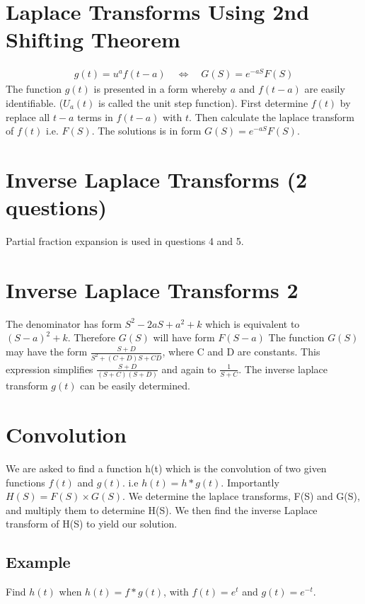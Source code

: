 \documentclass[12pt, a4paper]{article}
\begin{document}
\section{Laplace Transforms Using 2nd Shifting Theorem}

\begin{eqnarray}
 g(t) = u^{a}f(t-a) \quad \Leftrightarrow \quad G(S)= e^{-aS}F(S) \nonumber
\end{eqnarray}
The function $g(t)$ is presented in a form whereby $a$ and
$f(t-a)$ are easily identifiable. ($U_{a}(t)$ is called the unit
step function). First determine $f(t)$ by replace all $t-a$ terms
in $f(t-a)$ with $t$. Then calculate the laplace transform of
$f(t)$ i.e. $F(S)$. The solutions is in form $G(S)= e^{-aS}F(S)$.

\section{Inverse Laplace Transforms (2 questions) }
Partial fraction expansion is used in questions 4 and 5.
\section{Inverse Laplace Transforms 2}

The denominator has form $S^2 - 2aS + a^2 + k$ which is equivalent
to $(S-a)^2 + k$. Therefore $G(S)$ will have form $F(S-a)$
\newline
The function $G(S)$ may have the form $\frac{S+D}{S^2 +(C+D)S +
CD}$, where C and D are constants. This expression simplifies
$\frac{S+D}{(S+C)(S+D)}$ and again to $\frac{1}{S+C}$. The inverse
laplace transform $g(t)$ can be easily determined.
\section{Convolution}
We are asked to find a function h(t) which is the convolution of
two given functions $f(t)$ and $g(t)$. i.e $h(t)=h*g(t)$.\newline
Importantly $H(S) = F(S)\times G(S)$. We determine the laplace
transforms, F(S) and G(S), and multiply them to determine H(S). We
then find the inverse Laplace transform of H(S) to yield our
solution.
\subsection{Example}
Find $h(t)$ when $h(t) = f*g(t)$, with $f(t)= e^{t}$ and $g(t)=
e^{-t}$.\newline
\end{document}
